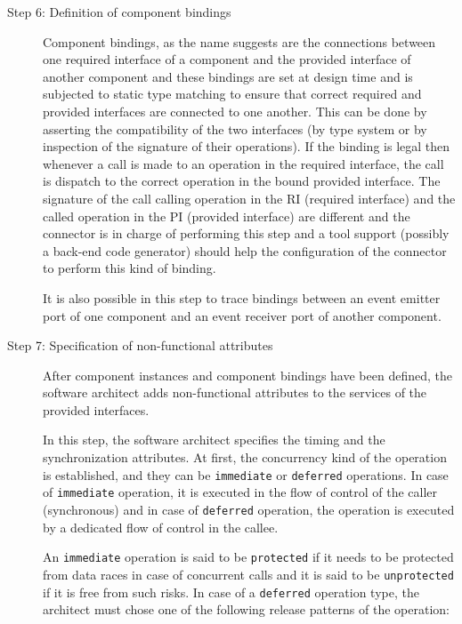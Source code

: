 \begin{description}
\item [Step 6: Definition of component bindings] Component bindings, as the name suggests are the connections between one required interface of a component and the provided interface of another component and these bindings are set at design time and is subjected to static type matching to ensure that correct required and provided interfaces are connected to one another. This can be done by asserting the compatibility of the two interfaces (by type system or by inspection of the signature of their operations). If the binding is legal then whenever a call is made to an operation in the required interface, the call is dispatch to the correct operation in the bound provided interface. The signature of the call calling operation in the RI (required interface) and the called operation in the PI (provided interface) are different and the connector is in charge of performing this step and a tool support (possibly a back-end code generator) should help the configuration of the connector to perform this kind of binding.

It is also possible in this step to trace bindings between an event emitter port of one component and an event receiver port of another component.

\item [Step 7: Specification of non-functional attributes] After component instances and component bindings have been defined, the software architect adds non-functional attributes to the services of the provided interfaces. 

In this step, the software architect specifies the timing and the synchronization attributes. At first, the concurrency kind of the operation is established, and they can be \texttt{immediate} or \texttt{deferred} operations. In case of \texttt{immediate} operation, it is executed in the flow of control of the caller (synchronous) and in case of \texttt{deferred} operation, the operation is executed by a dedicated flow of control in the callee. 

An \texttt{immediate} operation is said to be \texttt{protected} if it needs to be protected from data races in case of concurrent calls and it is said to be \texttt{unprotected} if it is free from such risks. In case of a \texttt{deferred} operation type, the architect must chose one of the following release patterns of the operation:


\end{description}
